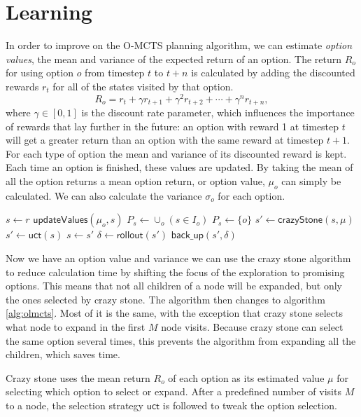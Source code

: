 \section{Learning}
\label{sec:learning}
In order to improve on the O-MCTS planning algorithm, we can estimate
\emph{option values}, the mean and variance of the expected return of an option.
The return $R_o$ for using option $o$ from timestep $t$ to $t+n$ is calculated
by adding the discounted rewards $r_t$ for all of the states visited by that
option.  $$R_o = r_{t} + \gamma r_{t+1} + \gamma^2 r_{t+2} + \cdots + \gamma^n
r_{t+n},$$ where $\gamma \in [0, 1]$ is the discount rate parameter, which
influences the importance of rewards that lay further in the future: an option
with reward 1 at timestep $t$ will get a greater return than an option with the
same reward at timestep $t+1$.  For each type of option the mean and variance of
its discounted reward is kept.  Each time an option is finished, these values
are updated.  By taking the mean of all the option returns a mean option return,
or option value, $\mu_o$ can simply be calculated. We can also calculate the
variance $\sigma_o$ for each option.

\begin{algorithm}
	\caption{$\mathsf{OL-MCTS}(r, max\_time, M)$}
	\label{alg:olmcts}
	\begin{algorithmic}[1]
		 \label{alg:olmcts:mainloop}
			\State $s \gets r$
			 \label{alg:olmcts:innerloop}
				 \label{alg:olmcts:sp}
				\State $\mathsf{updateValues}(\mu_o, s)$
					\State $P_s \gets \cup_o ( s \in I_o)$
				\Else
					\State $P_s \gets \{o\}$ %
				\EndIf \label{alg:olmcts:scs}
					\State $s' \gets \mathsf{crazyStone}(s, \mu)$ \label{alg:olmcts:crazystone}
				\Else
					\State $s' \gets \mathsf{uct}(s)$ \label{alg:olmcts:uct}
				\EndIf \label{alg:olmcts:ecs}
				\State $s \gets s'$ \label{alg:olmcts:ss}
			\EndWhile
			\State $\delta \gets \mathsf{rollout}(s')$ \label{alg:olmcts:rollout}
			\State $\mathsf{back\_up}(s', \delta)$ \label{alg:olmcts:backup}
		\EndWhile
	\end{algorithmic}
\end{algorithm}

Now we have an option value and variance we can use the crazy stone algorithm
to reduce calculation time by shifting the focus of the exploration to promising
options. This means that not all children of a node will be expanded, but only
the ones selected by crazy stone. The algorithm then changes to algorithm
\ref{alg:olmcts}. Most of it is the same, with the exception that crazy stone
selects what node to expand in the first $M$ node visits. Because crazy stone
can select the same option several times, this prevents the algorithm from
expanding all the children, which saves time. 

Crazy stone uses the mean return $R_o$ of each option as its estimated value
$\mu$ for selecting which option to select or expand. After a predefined number
of visits $M$ to a node, the selection strategy $\mathsf{uct}$ is followed to
tweak the option selection.


